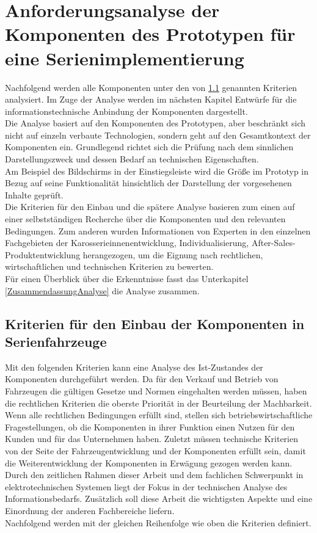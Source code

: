 \chapter{Anforderungsanalyse der Komponenten des Prototypen für eine Serienimplementierung}
\label{cha:Analyse}
Nachfolgend werden alle Komponenten unter den von \ref{cha:Kriterien} genannten Kriterien analysiert. Im Zuge der Analyse werden im nächsten Kapitel Entwürfe für die informationstechnische Anbindung der Komponenten dargestellt.\\
Die Analyse basiert auf den Komponenten des Prototypen, aber beschränkt sich nicht auf einzeln verbaute Technologien, sondern geht auf den Gesamtkontext der Komponenten ein. Grundlegend richtet sich die Prüfung nach dem sinnlichen Darstellungszweck und dessen Bedarf an technischen Eigenschaften. \\
Am Beispiel des Bildschirms in der Einstiegsleiste wird die Größe im Prototyp in Bezug auf seine Funktionalität hinsichtlich der Darstellung der vorgesehenen Inhalte geprüft. \\
Die Kriterien für den Einbau und die spätere Analyse basieren zum einen auf einer selbstständigen Recherche über die Komponenten und den relevanten Bedingungen. Zum anderen wurden Informationen von Experten in den einzelnen Fachgebieten der Karosserieinnenentwicklung, Individualisierung, After-Sales-Produktentwicklung herangezogen, um die Eignung nach rechtlichen, wirtschaftlichen und technischen Kriterien zu bewerten. \\
Für einen Überblick über die Erkenntnisse fasst das Unterkapitel \ref{ZusammendassungAnalyse} die Analyse zusammen.
\section{Kriterien für den Einbau der Komponenten in Serienfahrzeuge}
\label{cha:Kriterien}
Mit den folgenden Kriterien kann eine Analyse des Ist-Zustandes der Komponenten durchgeführt werden.
Da für den Verkauf und Betrieb von Fahrzeugen die gültigen Gesetze und Normen eingehalten werden müssen, haben die rechtlichen Kriterien die oberste Priorität in der Beurteilung der Machbarkeit. Wenn alle rechtlichen Bedingungen erfüllt sind, stellen sich betriebswirtschaftliche Fragestellungen, ob die Komponenten in ihrer Funktion einen Nutzen für den Kunden und für das Unternehmen haben. Zuletzt müssen technische Kriterien von der Seite der Fahrzeugentwicklung und der Komponenten erfüllt sein, damit die Weiterentwicklung der Komponenten in Erwägung gezogen werden kann. \\
Durch den zeitlichen Rahmen dieser Arbeit und dem fachlichen Schwerpunkt in elektrotechnischen Systemen liegt der Fokus in der technischen Analyse des Informationsbedarfs. Zusätzlich soll diese Arbeit die wichtigsten Aspekte und eine Einordnung der anderen Fachbereiche liefern.\\
Nachfolgend werden mit der gleichen Reihenfolge wie oben die Kriterien definiert.
